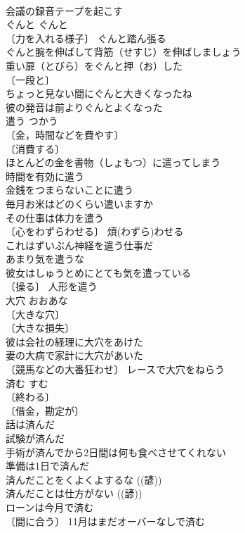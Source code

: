 \documentclass[8pt]{extreport}
\begin{document}
\begin{CJK}{UTF8}{min}
\\	会議の録音テープを起こす 
\\	ぐんと	ぐんと	
\\	〔力を入れる様子〕 ぐんと踏ん張る 
\\	ぐんと腕を伸ばして背筋（せすじ）を伸ばしましょう 
\\	重い扉（とびら）をぐんと押（お）した 
\\	〔一段と〕　
\\	ちょっと見ない間にぐんと大きくなったね 
\\	彼の発音は前よりぐんとよくなった 
\\	遣う	つかう	
\\	〔金，時間などを費やす〕
\\	〔消費する〕
\\	ほとんどの金を書物（しょもつ）に遣ってしまう 
\\	時間を有効に遣う 
\\	金銭をつまらないことに遣う 
\\	毎月お米はどのくらい遣いますか 
\\	その仕事は体力を遣う 
\\	〔心をわずらわせる〕 煩(わずら)わせる 
\\	これはずいぶん神経を遣う仕事だ 
\\	あまり気を遣うな 
\\	彼女はしゅうとめにとても気を遣っている 
\\	〔操る〕 人形を遣う 
\\	大穴	おおあな	
\\	〔大きな穴〕
\\	〔大きな損失〕
\\	彼は会社の経理に大穴をあけた 
\\	妻の大病で家計に大穴があいた 
\\	〔競馬などの大番狂わせ〕 レースで大穴をねらう 
\\	済む	すむ	
\\	〔終わる〕
\\	〔借金，勘定が〕
\\	話は済んだ 
\\	試験が済んだ 
\\	手術が済んでから2日間は何も食べさせてくれない 
\\	準備は1日で済んだ 
\\	済んだことをくよくよするな ((諺)) 
\\	済んだことは仕方がない ((諺)) 
\\	ローンは今月で済む 
\\	〔間に合う〕 11月はまだオーバーなしで済む 

\end{CJK}
\end{document}
